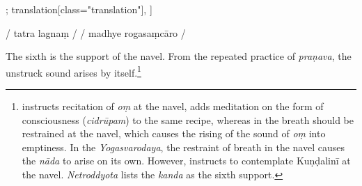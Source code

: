\begin{alignment}[
  texts=edition[class="edition"];
  translation[class="translation"],
  ]
\begin{edition}
\begin{prose}[p30_03]
/
tatra
lagnaṃ
/
/
madhye 
rogasaṃcāro
/
    \end{prose}
  \end{edition}
  \begin{translation}
    \begin{tlate}[p30_03]
      \noindent
      The sixth is the support of the navel. From the repeated practice of \textit{praṇava}, the unstruck sound arises by itself.\footnote{ instructs recitation of \textit{oṃ} at the navel,  adds meditation on the form of consciousness (\textit{cidrūpam}) to the same recipe, whereas in  the breath should be restrained at the navel, which causes the rising of the sound of \textit{oṃ} into emptiness. In the \textit{Yogasvarodaya}, the restraint of breath in the navel causes the \textit{nāda} to arise on its own. However,  instructs to contemplate Kuṇḍalinī at the navel. \textit{Netroddyota} lists the \textit{kanda} as the sixth support.}


\end{tlate}
\end{translation}
\end{alignment}
